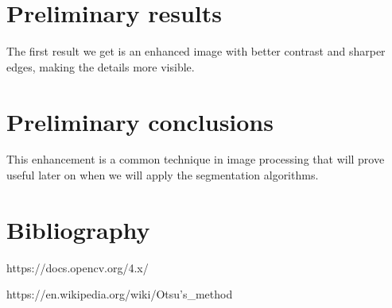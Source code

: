 \documentclass[conference]{IEEEtran}
\begin{document}
\section{Preliminary results}
The first result we get is an enhanced image with better contrast and sharper edges, making the details more visible. 

\section{Preliminary conclusions}
This enhancement is a common technique in image processing that will prove useful later on when we will apply the segmentation algorithms.

\section{Bibliography}
https://docs.opencv.org/4.x/

https://en.wikipedia.org/wiki/Otsu's_method
\end{document}
